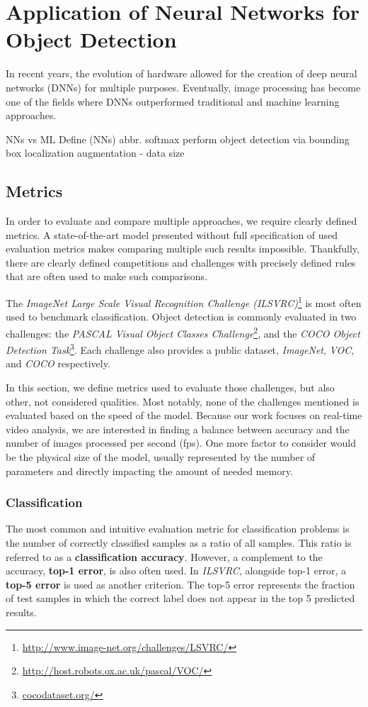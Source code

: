 \chapter{Application of Neural Networks for Object Detection}
In recent years, the evolution of hardware allowed for the creation of deep neural networks (DNNs) for multiple purposes. Eventually, image processing has become one of the fields where DNNs outperformed traditional and machine learning approaches. 

NNs vs ML
Define (NNs) abbr.
softmax
perform object detection via bounding box localization
augmentation - data size

\section{Metrics}
In order to evaluate and compare multiple approaches, we require clearly defined metrics. A state-of-the-art model presented without full specification of used evaluation metrics makes comparing multiple such results impossible. Thankfully, there are clearly defined competitions and challenges with precisely defined rules that are often used to make such comparisons. 

The \textit{ImageNet Large Scale Visual Recognition Challenge (ILSVRC)}\footnote{\url{http://www.image-net.org/challenges/LSVRC/}} is most often used to benchmark classification. Object detection is commonly evaluated in two challenges: the \textit{PASCAL Visual Object Classes Challenge}\footnote{\url{http://host.robots.ox.ac.uk/pascal/VOC/}}, and the \textit{COCO Object Detection Task}\footnote{\url{cocodataset.org/}}. Each challenge also provides a public dataset, \textit{ImageNet}, \textit{VOC}, and \textit{COCO} respectively.

In this section, we define metrics used to evaluate those challenges, but also other, not considered qualities. Most notably, none of the challenges mentioned is evaluated based on the speed of the model. Because our work focuses on real-time video analysis, we are interested in finding a balance between accuracy and the number of images processed per second (fps). One more factor to consider would be the physical size of the model, usually represented by the number of parameters and directly impacting the amount of needed memory.

\subsection*{Classification}
The most common and intuitive evaluation metric for classification problems is the number of correctly classified samples as a ratio of all samples. This ratio is referred to as a \textbf{classification accuracy}. However, a complement to the accuracy, \textbf{top-1 error}, is also often used. In \textit{ILSVRC},  alongside top-1 error, a \textbf{top-5 error} is used as another criterion. The top-5 error represents the fraction of test samples in which the correct label does not appear in the top 5 predicted results.

